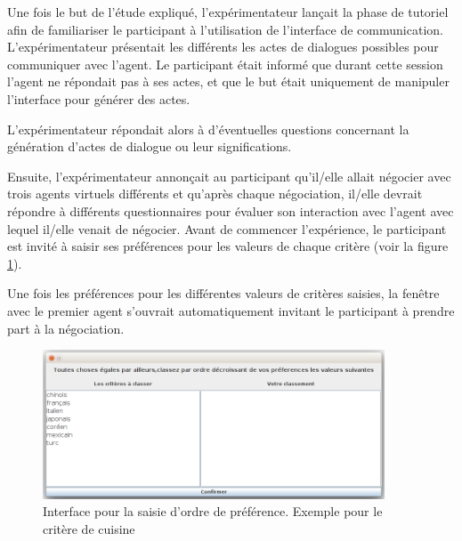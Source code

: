 		Une fois le but de l'étude expliqué, l'expérimentateur lançait la phase de tutoriel afin de familiariser le participant à l'utilisation de l'interface de communication. 	L'expérimentateur présentait les différents les actes de dialogues possibles pour communiquer avec l'agent. 	
		Le participant était informé que durant cette session l'agent ne répondait pas à ses actes, et que le but était uniquement de manipuler l'interface pour générer des actes. 
	
		L’expérimentateur répondait alors à d’éventuelles questions concernant la génération d'actes de dialogue ou leur significations.
		
		Ensuite, l’expérimentateur annonçait au participant qu’il/elle allait négocier avec trois  agents virtuels différents et
		qu’après chaque négociation, il/elle devrait répondre à différents questionnaires pour évaluer son interaction avec l’agent avec lequel il/elle venait de négocier.  Avant de commencer l'expérience, le participant est invité à saisir ses préférences pour les valeurs de chaque critère (voir la figure \ref{fig:pref}).
		
		Une fois les préférences pour les différentes valeurs de critères saisies, la fenêtre avec le premier agent s'ouvrait automatiquement invitant le participant à prendre part à la négociation. 
		
		\begin{figure}[b]
			\includegraphics[width=4in]{Figures/pref.png}
			\caption{\label{fig:pref} Interface pour la saisie d'ordre de préférence. Exemple pour le critère de cuisine}
		\end{figure} 

	
